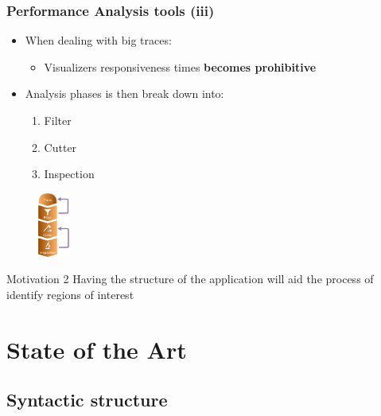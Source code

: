 \documentclass{beamer}
\begin{document}
\begin{frame}
\frametitle{Performance Analysis tools (iii)}
\begin{itemize}
	\item When dealing with big traces:
	\begin{itemize}
		\item Visualizers responsiveness times \textbf{becomes prohibitive}
	\end{itemize}
	\item Analysis phases is then break down into:
	\begin{enumerate}
		\item Filter
		\item Cutter
		\item Inspection
	\end{enumerate}
\end{itemize}
\begin{figure}
	\includegraphics[width=40px]{imgs/analysis_subphases.png}
\end{figure}
\pause
\begin{block}{Motivation 2}
	Having the structure of the application will aid the process of identify regions of interest
\end{block}
\end{frame}

\section{State of the Art}
\subsection{Syntactic structure}
\end{document}

